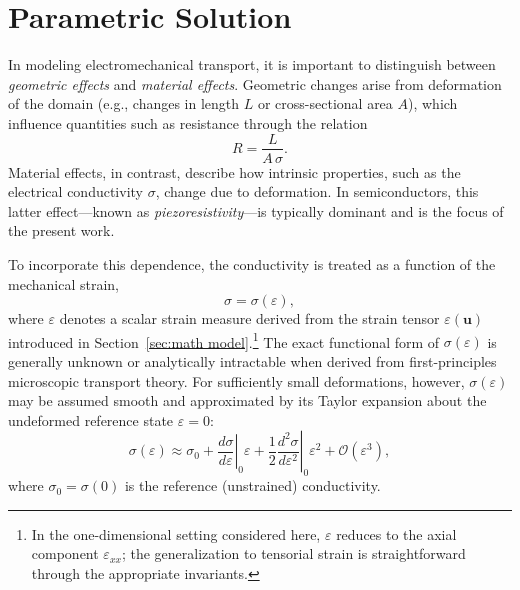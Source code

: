 \section{Parametric Solution}
\label{sec:parametric}

In modeling electromechanical transport, it is important to distinguish between
\emph{geometric effects} and \emph{material effects}. Geometric changes arise from
deformation of the domain (e.g., changes in length $L$ or cross-sectional area $A$),
which influence quantities such as resistance through the relation
\begin{equation}
    R = \frac{L}{A\,\sigma}.
    \label{eq:resistance}
\end{equation}
Material effects, in contrast, describe how intrinsic properties, such as the
electrical conductivity $\sigma$, change due to deformation. In semiconductors,
this latter effect---known as \emph{piezoresistivity}---is typically dominant
and is the focus of the present work.

To incorporate this dependence, the conductivity is treated as a function of the
mechanical strain,
\begin{equation}
    \sigma = \sigma(\varepsilon),
    \label{eq:sigma_eps}
\end{equation}
where $\varepsilon$ denotes a scalar strain measure derived from the strain tensor
$\varepsilon(\mathbf{u})$ introduced in Section~\ref{sec:math model}.\footnote{In the
one-dimensional setting considered here, $\varepsilon$ reduces to the axial
component $\varepsilon_{xx}$; the generalization to tensorial strain is
straightforward through the appropriate invariants.} The exact functional form of
$\sigma(\varepsilon)$ is generally unknown or analytically intractable when
derived from first-principles microscopic transport theory. For sufficiently
small deformations, however, $\sigma(\varepsilon)$ may be assumed smooth and
approximated by its Taylor expansion about the undeformed reference state
$\varepsilon = 0$:
\begin{equation}
    \sigma(\varepsilon)
    \approx \sigma_0
    + \left.\frac{d\sigma}{d\varepsilon}\right|_{0}\!\varepsilon
    + \frac{1}{2}\left.\frac{d^2\sigma}{d\varepsilon^2}\right|_{0}\!\varepsilon^{2}
    + \mathcal{O}(\varepsilon^{3}),
    \label{eq:taylor_raw}
\end{equation}
where $\sigma_0 = \sigma(0)$ is the reference (unstrained) conductivity.


